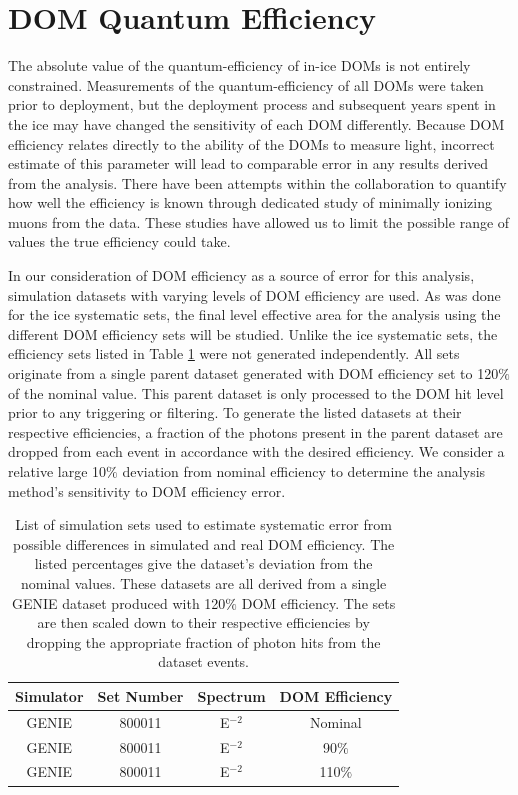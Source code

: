 \documentclass{gatech-thesis}
\begin{document}
\section{DOM Quantum Efficiency}
The absolute value of the quantum-efficiency of in-ice DOMs is not entirely constrained. Measurements of the quantum-efficiency of all DOMs were taken prior to deployment, but the deployment process and subsequent years spent in the ice may have changed the sensitivity of each DOM differently. Because DOM efficiency relates directly to the ability of the DOMs to measure light, incorrect estimate of this parameter will lead to comparable error in any results derived from the analysis. There have been attempts within the collaboration to quantify how well the efficiency is known through dedicated study of minimally ionizing muons from the data. These studies have allowed us to limit the possible range of values the true efficiency could take.

In our consideration of DOM efficiency as a source of error for this analysis, simulation datasets with varying levels of DOM efficiency are used. As was done for the ice systematic sets, the final level effective area for the analysis using the different DOM efficiency sets will be studied. Unlike the ice systematic sets, the efficiency sets listed in Table \ref{tab:eff_sets} were not generated independently. All sets originate from a single parent dataset generated with DOM efficiency set to 120$\%$ of the nominal value. This parent dataset is only processed to the DOM hit level prior to any triggering or filtering. To generate the listed datasets at their respective efficiencies, a fraction of the photons present in the parent dataset are dropped from each event in accordance with the desired efficiency. We consider a relative large 10$\%$ deviation from nominal efficiency to determine the analysis method's sensitivity to DOM efficiency error.

\begin{table}[h]
\caption[DOM Efficiency Systematic Datasets]{List of simulation sets used to estimate systematic error from possible differences in simulated and real DOM efficiency. The listed percentages give the dataset's deviation from the nominal values. These datasets are all derived from a single GENIE dataset produced with 120$\%$ DOM efficiency. The sets are then scaled down to their respective efficiencies by dropping the appropriate fraction of photon hits from the dataset events.\label{tab:eff_sets}}
\begin{center}
\begin{tabular}{cccc}
\toprule
\textbf{Simulator} & \textbf{Set Number} &\textbf{Spectrum} & \textbf{DOM Efficiency} \\
\midrule
GENIE & 800011 & E$^{-2}$ & Nominal  \\
GENIE & 800011 & E$^{-2}$ & 90$\%$ \\
GENIE & 800011 & E$^{-2}$ & 110$\%$ \\
\hline
\end{tabular}
\end{center}
\end{table}
\end{document}
